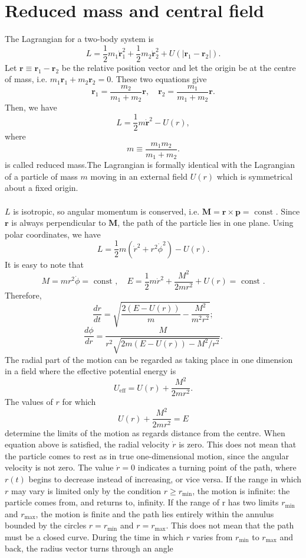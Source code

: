 \section{Reduced mass and central field}
The Lagrangian for a two-body system is
\[L = \frac{1}{2} m_1 \dot{\bm{r}}_1^2 + \frac{1}{2} m_2 \dot{\bm{r}}_2^2 + U(|\bm{r}_1 - \bm{r}_2|).\]
Let $\bm{r} \equiv \bm{r}_1 -\bm{r}_2 $ be the relative position vector and let the origin be at the centre of mass, i.e. $m_1\bm{r}_1 + m_2\bm{r}_2 = 0$. These two equations give
\[\bm{r}_1 = \frac{m_2}{m_1+m_2}\bm{r} ,\quad \bm{r}_2 = \frac{m_1}{m_1+m_2}\bm{r}.\]
Then, we have
\[L = \frac{1}{2} m \dot{\bm{r}}^2 - U(r),\]
where
\[m \equiv \frac{m_1m_2}{m_1+m_2}.\]
is called reduced mass.The Lagrangian is formally identical with the Lagrangian of a particle of mass $m$ moving in an external field $U(r)$ which is symmetrical about a fixed origin. 
\\ \\
$L$ is isotropic, so angular momentum is conserved, i.e. $\bm{M} = \bm{r} \times \bm{p} = \mbox{ const }$. Since $\bm{r}$ is always perpendicular to $\bm{M}$, the path of the particle lies in one plane. Using polar coordinates, we have
\[L = \frac{1}{2}m(\dot{r}^2 + r^2 \dot{\phi}^2)-U(r).\]
It is easy to note that
\[M = mr^2\dot{\phi} = \mbox{ const }, \quad E = \frac{1}{2}m \dot{r}^2 + \frac{M^2}{2mr^2} + U(r) = \mbox{ const }.\]
Therefore,
\[\frac{dr}{dt} = \sqrt{\frac{2(E-U(r))}{m} - \frac{M^2}{m^2r^2}};\]
\[\frac{d\phi}{dr} = \frac{M}{r^2 \sqrt{2m(E-U(r))-M^2/r^2}}.\]
The radial part of the motion can be regarded as taking place in one dimension in a field where the effective potential energy is
\[U_{\mathrm{eff}} = U(r) + \frac{M^2}{2mr^2}.\]
The values of $r$ for which
\[U(r) + \frac{M^2}{2mr^2} = E \]
determine the limits of the motion as regards distance from the centre. When equation above is satisfied, the radial velocity $\dot{r}$ is zero. This does not mean that the particle comes to rest as in true one-dimensional motion, since the angular velocity is not zero. The value $\dot{r} = 0$ indicates a turning point of the path, where $r(t)$ begins to decrease instead of increasing, or vice versa.
If the range in which $r$ may vary is limited only by the condition $r \ge r_{\mathrm{min}}$, the motion is infinite: the particle comes from, and returns to, infinity.
If the range of r has two limits $r_{\mathrm{min}}$ and $r_{\mathrm{max}}$, the motion is finite and the path lies entirely within the annulus bounded by the circles $r = r_{\mathrm{min}}$ and $r = r_{\mathrm{max}}$. This does not mean that the path must be a closed curve. During the time in which $r$ varies from $r_{\mathrm{min}}$ to $r_{\mathrm{max}}$ and back, the radius vector turns through an angle
